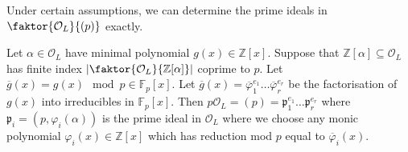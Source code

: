 Under certain assumptions, we can determine the prime ideals in \( \faktor{\mathcal O_L}{(p)} \) exactly.
\begin{theorem}
    Let \( \alpha \in \mathcal O_L \) have minimal polynomial \( g(x) \in \mathbb Z[x] \).
    Suppose that \( \mathbb Z[\alpha] \subseteq \mathcal O_L \) has finite index \( \abs{\faktor{\mathcal O_L}{\mathbb Z[\alpha]}} \) coprime to \( p \).
    Let \( \overline g(x) = g(x) \mod p \in \mathbb F_p[x] \).
    Let \( \overline g(x) = \overline \varphi_1^{e_1} \dots \overline \varphi_r^{e_r} \) be the factorisation of \( g(x) \) into irreducibles in \( \mathbb F_p[x] \).
    Then \( p\mathcal O_L = (p) = \mathfrak p_1^{e_1} \dots \mathfrak p_r^{e_r} \) where \( \mathfrak p_i = (p, \varphi_i(\alpha)) \) is the prime ideal in \( \mathcal O_L \) where we choose any monic polynomial \( \varphi_i(x) \in \mathbb Z[x] \) which has reduction mod \( p \) equal to \( \overline \varphi_i(x) \).
\end{theorem}
